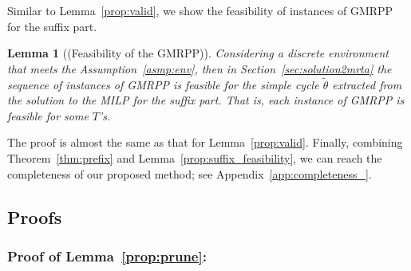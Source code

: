 \documentclass[Afour,sageh,times]{sagej}
\newtheorem{lem}[thm]{Lemma}
\newtheorem{prop}[thm]{Proposition}
\newcommand{\ltl}{ {\it LTL}$_{-\bigcirc}$ }
\newcommand{\autop}{\ccalA_{\phi}}
\renewcommand{\ap}[3]{\mathcal{\pi}_{{#1},{#2}}^{#3}}
\begin{document}
{Similar to Lemma~\ref{prop:valid}, we show the feasibility of instances of GMRPP for the suffix part. %
\begin{lem}[(Feasibility of the GMRPP)]\label{prop:suffix_valid}
 Considering  a discrete environment that meets the Assumption~\ref{asmp:env}, then in Section~\ref{sec:solution2mrta} the sequence of instances of GMRPP  is feasible for the simple cycle $\tilde{\theta}$ extracted from the solution to the MILP for the suffix part. That is, each instance of GMRPP is feasible for some $T$'s.
\end{lem}
The  proof is almost the same as that for Lemma~\ref{prop:valid}. Finally, combining Theorem~\ref{thm:prefix} and Lemma~\ref{prop:suffix_feasibility}, we can reach the completeness of our proposed method; see Appendix~\ref{app:completeness_}.

\subsection{Proofs}
\subsubsection{Proof of Lemma~\ref{prop:prune}:}\label{app:prune}

}
\end{document}

